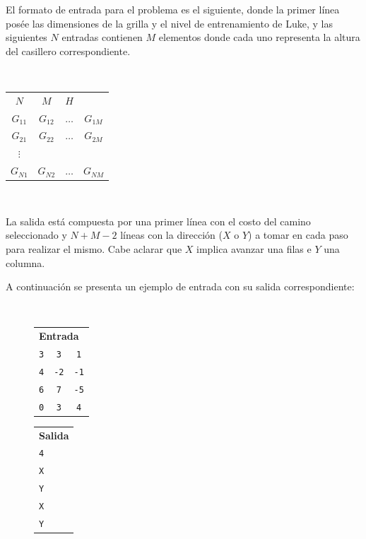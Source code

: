 	El formato de entrada para el problema es el siguiente, donde la primer
	línea posée las dimensiones de la grilla y el nivel de entrenamiento de
	Luke, y las siguientes $N$ entradas contienen $M$ elementos donde cada uno
	representa la altura del casillero correspondiente.

	~
	\begin{center}
		\begin{tabular}{cccc}
			$N$ & $M$ & $H$ & \\
			$G_{11}$ & $G_{12}$ & $\dots$ & $G_{1M}$ \\
			$G_{21}$ & $G_{22}$ & $\dots$ & $G_{2M}$ \\
			$\vdots$ & & & \\
			$G_{N1}$ & $G_{N2}$ & $\dots$ & $G_{NM}$ \\
		\end{tabular}
	\end{center}

	~

	La salida está compuesta por una primer línea con el costo del camino
	seleccionado y $N + M - 2$ líneas con la dirección ($X$ o $Y$) a tomar en cada paso para
	realizar el mismo. Cabe aclarar que $X$ implica avanzar una filas e $Y$
	una columna.

	A continuación se presenta un ejemplo de entrada con su salida
	correspondiente:

	~

	\begin{figure}[H]
		\centering
		\begin{minipage}[t]{0.25\textwidth}
			\begin{tabular}[t]{ccc}
				\multicolumn{3}{l}{\textbf{Entrada}} \\
				\texttt{3} & \texttt{3} & \texttt{1} \\
				\texttt{4} & \texttt{-2} & \texttt{-1} \\
				\texttt{6} & \texttt{7} & \texttt{-5} \\
				\texttt{0} & \texttt{3} & \texttt{4} \\
			\end{tabular}
		\end{minipage}
		\begin{minipage}[t]{0.10\textwidth}
			\begin{tabular}[t]{l}
				\textbf{Salida} \\
				\texttt{4} \\
				\texttt{X} \\
				\texttt{Y} \\
				\texttt{X} \\
				\texttt{Y} \\
			\end{tabular}
		\end{minipage}
	\end{figure}

